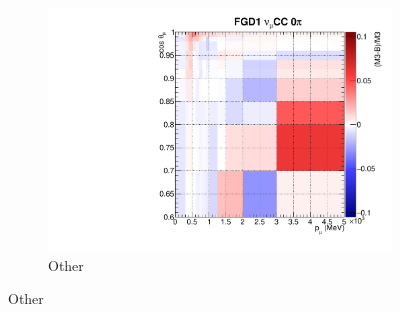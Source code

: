 \begin{figure}
\begin{subfigure}[t]{0.32\textwidth}
		\includegraphics[width=\textwidth, trim={0mm 0mm 10mm 7mm}, clip, page=9]{figures/mach3/banff/postfit_comp}
		\caption{Other}
	\end{subfigure}
	

\end{figure}
